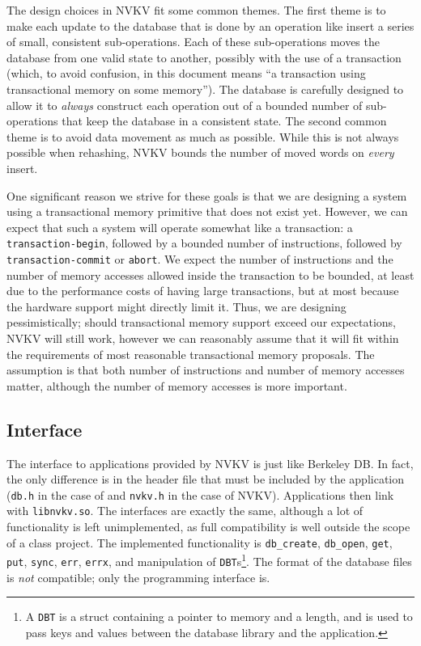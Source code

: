 The design choices in NVKV fit some common themes. The first theme is to make
each update to the database that is done by an operation like insert a series of
small, consistent sub-operations. Each of these sub-operations moves the
database from one valid state to another, possibly with the use of a transaction
(which, to avoid confusion, in this document means ``a transaction using
transactional memory on some memory''). The database is carefully designed to
allow it to \textit{always} construct each operation out of a bounded number of
sub-operations that keep the database in a consistent state. The second common
theme is to avoid data movement as much as possible. While this is not always
possible when rehashing, NVKV bounds the number of moved words on \textit{every}
insert.

One significant reason we strive for these goals is that we are designing a
system using a transactional memory primitive that does not exist yet. However,
we can expect that such a system will operate somewhat like a transaction: a
\texttt{transaction-begin}, followed by a bounded number of instructions,
followed by \texttt{transaction-commit} or \texttt{abort}. We expect the number
of instructions and the number of memory accesses allowed inside the transaction
to be bounded, at least due to the performance costs of having large
transactions, but at most because the hardware support might directly limit it.
Thus, we are designing pessimistically; should transactional memory support
exceed our expectations, NVKV will still work, however we can reasonably assume
that it will fit within the requirements of most reasonable transactional memory
proposals. The assumption is that both number of instructions and number of
memory accesses matter, although the number of memory accesses is more
important.

\subsection{Interface}

The interface to applications provided by NVKV is just like Berkeley DB. In
fact, the only difference is in the header file that must be included by the
application (\texttt{db.h} in the case of \bdb and \texttt{nvkv.h} in the case
of NVKV). Applications then link with \texttt{libnvkv.so}. The interfaces are
exactly the same, although a lot of functionality is left unimplemented, as full
compatibility is well outside the scope of a class project. The implemented
functionality is \texttt{db\_create}, \texttt{db\_open}, \texttt{get},
\texttt{put}, \texttt{sync}, \texttt{err}, \texttt{errx}, and manipulation of
\texttt{DBT}s\footnote{A \texttt{DBT} is a struct containing a pointer to memory
and a length, and is used to pass keys and values between the database library
and the application.}. The format of the database files is \textit{not} compatible; only
the programming interface is.


